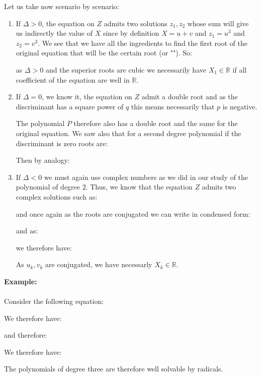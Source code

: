 	Let us take now scenario by scenario:
	\begin{enumerate}
		\item If $\Delta >0$, the equation on $Z$ admits two solutions $z_1,z_2$ whose sum will give us indirectly the value of $X$ since by definition $X=u+v$ and $z_1=u^3$ and $z_2=v^3$. We see that we have all the ingredients to find the first root of the original equation that will be the certain root (or ""). So:
		
		as $\Delta>0$ and the superior roots are cubic we necessarily have $X_1\in \mathbb{R}$ if all coefficient of the equation are well in $\mathbb{R}$.
		
		\item If $\Delta=0$, we know it, the equation on $Z$ admit a double root and as the discriminant has a square power of $q$ this means necessarily that $p$ is negative.

		The polynomial $P$ therefore also has a double root and the same for the original equation. We saw also that for a second degree polynomial if the discriminant is zero roots are:
		
		Then by analogy:
		
		
		\item If $\Delta<0$ we must again use complex numbers as we did in our study of the polynomial of degree $2$. Thus, we know that the equation $Z$ admits two complex solutions such as:
		
		and once again as the roots are conjugated we can write in condensed form:
		
		and as:
		
		we therefore have:
		
		As $u_k,v_k$ are conjugated, we have necessarly $X_k\in \mathbb{R}$.
	\end{enumerate}
	
	\pagebreak
	\begin{tcolorbox}[colframe=black,colback=white,sharp corners]
	\textbf{{\Large {}}Example:}\\\\
	Consider the following equation:
	
	We therefore have:
	
	and therefore:
	
	We therefore have:
	
	\end{tcolorbox}
	The polynomials of degree three are therefore well solvable by radicals.
	
